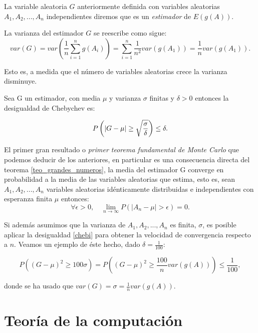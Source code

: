 \documentclass[../proyecto.tex]{memoir}
\begin{document}
\begin{defi}
La variable aleatoria $G$ anteriormente definida con variables aleatorias $A_1,A_2,...,A_n$ independientes diremos que es un \textit{estimador} de $E(g(A))$.
\end{defi}

La varianza del estimador $G$ se reescribe como sigue:
$$
var(G) = var \left( \frac{1}{n} \sum_{i=1}^{n} g(A_i) \right) = \sum_{i=1}^{n} \frac{1}{n^2} var(g(A_1)) = \frac{1}{n} var(g(A_1)).
$$

Esto es, a medida que el número de variables aleatorias crece la varianza disminuye.

\begin{defi} \label{chebi}
Sea G un estimador, con media $\mu$ y varianza $\sigma$ finitas y $\delta>0$ entonces la desigualdad de Chebychev es:

$$
P \left( \abs{G-\mu} \geq \sqrt{\frac{\sigma}{\delta}} \right) \leq \delta.
$$

\end{defi}

El primer gran resultado o \textit{primer teorema fundamental de Monte Carlo} que podemos deducir de los anteriores, en particular es una consecuencia directa del teorema \ref{teo_grandes_numeros}, la media del estimador G converge en probabilidad a la media de las variables aleatorias que estima, esto es, sean $A_1,A_2,...,A_n$ variables aleatorias idénticamente distribuidas e independientes con esperanza finita $\mu$ entonces:
$$
\forall \epsilon > 0,\quad \lim_{n\to\infty} P( |A_n-\mu|> \epsilon ) = 0.
$$

Si además asumimos que la varianza de $A_1,A_2,...,A_n$ es finita, $\sigma$, es posible aplicar la desigualdad \ref{chebi} para obtener la velocidad de convergencia respecto a $n$. Veamos un ejemplo de éste hecho, dado $\delta=\frac{1}{100}$:

$$
P \left( ( G - \mu )^2 \geq 100 \sigma \right) = P \left( ( G - \mu )^2 \geq \frac{100}{n} var(g(A)) \right)  \leq \frac{1}{100},
$$

donde se ha usado que $var(G) = \sigma = \frac{1}{n} var(g(A))$.

\section{Teoría de la computación}
\end{document}
